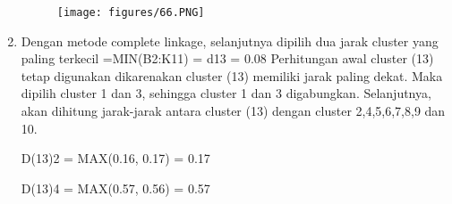 \begin{enumerate}
    \begin{figure} [htbp]
    \texttt{[image: figures/66.PNG]}
    \end{figure}
       \vspace{6cm}
    
\begin{table}[htbp]
\centering
\caption{Matrik Jarak, dengan Euclidian Distance}
\label{tab:my-table}
\end{table}

\item Dengan metode complete linkage, selanjutnya dipilih dua jarak cluster yang paling terkecil =MIN(B2:K11) = d13 = 0.08
Perhitungan awal cluster (13) tetap digunakan dikarenakan cluster (13) memiliki jarak paling dekat. Maka dipilih cluster 1 dan 3, sehingga cluster 1 dan 3 digabungkan. Selanjutnya, akan dihitung jarak-jarak antara cluster (13) dengan cluster 2,4,5,6,7,8,9 dan 10.

D(13)2 = MAX(0.16, 0.17) = 0.17

D(13)4 = MAX(0.57, 0.56) = 0.57


\end{enumerate}

